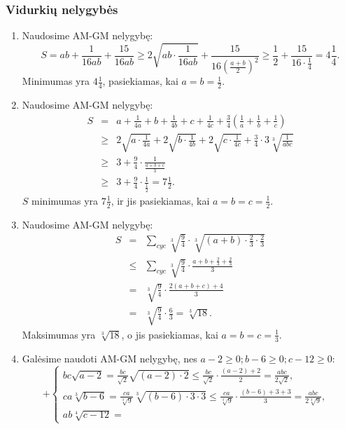 \subsubsection*{Vidurkių nelygybės}
\begin{enumerate}
\item
    Naudosime AM-GM nelygybę:
    $$S=ab+\frac{1}{16ab}+\frac{15}{16ab}\geq2\sqrt{ab\cdot\frac{1}{16ab}}+\frac{15}{16\left(\frac{a+b}{2}\right)^2}
    \geq\frac{1}{2}+\frac{15}{16\cdot\frac{1}{4}}=4\frac{1}{4}.$$
    Minimumas yra $4\frac{1}{4}$, pasiekiamas, kai $a=b=\frac{1}{2}$.
\item
    Naudosime AM-GM nelygybę: \begin{eqnarray*}
    S&=&a+\frac{1}{4a}+b+\frac{1}{4b}+c+\frac{1}{4c}+\frac{3}{4}\left(\frac{1}{a}+\frac{1}{b}+\frac{1}{c}\right)\\
    &\geq&2\sqrt{a\cdot\frac{1}{4a}}+2\sqrt{b\cdot\frac{1}{4b}}+
    2\sqrt{c\cdot\frac{1}{4c}}+ \frac{3}{4}\cdot3\sqrt[3]{\frac{1}{abc}}\\
    &\geq&3+\frac{9}{4}\cdot\frac{1}{\frac{a+b+c}{3}}\\
    &\geq&3+\frac{9}{4}\cdot\frac{1}{\frac{1}{2}}=7\frac{1}{2}.
    \end{eqnarray*} $S$ minimumas yra $7\frac{1}{2}$, ir jis pasiekiamas,
    kai $a=b=c=\frac{1}{2}$.
\item
    Naudosime AM-GM nelygybę: \begin{eqnarray*}
    S&=&\sum_{cyc}{\sqrt[3]{\frac{9}{4}}\cdot\sqrt[3]{(a+b)\cdot\frac{2}{3}\cdot\frac{2}{3}}}\\
    &\leq&\sum_{cyc}{\sqrt[3]{\frac{9}{4}}\cdot\frac{a+b+\frac{2}{3}+\frac{2}{3}}{3}}\\
    &=&\sqrt[3]{\frac{9}{4}}\cdot\frac{2(a+b+c)+4}{3}\\
    &=&\sqrt[3]{\frac{9}{4}}\cdot\frac{6}{3}=\sqrt[3]{18}.\end{eqnarray*}
    Maksimumas yra $\sqrt[3]{18}$, o jis pasiekiamas, kai
    $a=b=c=\frac{1}{3}$.
\item
    Galėsime naudoti AM-GM nelygybę, nes $a-2\geq0; b-6\geq0; c-12\geq0$:
    $$+\left\{ \begin{array}{ll}
    bc\sqrt{a-2}=\frac{bc}{\sqrt{2}}\sqrt{(a-2)\cdot2}\leq\frac{bc}{\sqrt{2}}\cdot\frac{(a-2)+2}{2}=
    \frac{abc}{2\sqrt{2}}, & \\ ca\sqrt[3]{b-6}=
    \frac{ca}{\sqrt[3]{9}}\sqrt[3]{(b-6)\cdot3\cdot3}\leq\frac{ca}{\sqrt[3]{9}}\cdot\frac{(b-6)+3+3}{3}=
    \frac{abc}{2\sqrt[3]{9}},&\\ ab\sqrt[4]{c-12}=

\end{array}$$
\end{enumerate}
